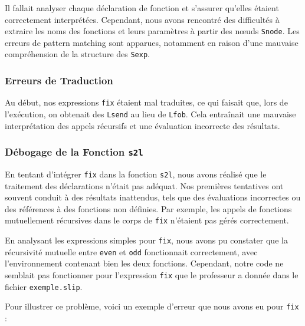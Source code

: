 \documentclass[a4paper,12pt]{article}
\begin{document}
Il fallait analyser chaque déclaration de fonction et s'assurer qu'elles étaient correctement interprétées. Cependant, nous avons rencontré des difficultés à extraire les noms des fonctions et leurs paramètres à partir des nœuds \texttt{Snode}. Les erreurs de pattern matching sont apparues, notamment en raison d'une mauvaise compréhension de la structure des \texttt{Sexp}.

\subsubsection{Erreurs de Traduction}

Au début, nos expressions \texttt{fix} étaient mal traduites, ce qui faisait que, lors de l'exécution, on obtenait des \texttt{Lsend} au lieu de \texttt{Lfob}. Cela entraînait une mauvaise interprétation des appels récursifs et une évaluation incorrecte des résultats.

\subsubsection{Débogage de la Fonction \texttt{s2l}}

En tentant d'intégrer \texttt{fix} dans la fonction \texttt{s2l}, nous avons réalisé que le traitement des déclarations n'était pas adéquat. Nos premières tentatives ont souvent conduit à des résultats inattendus, tels que des évaluations incorrectes ou des références à des fonctions non définies. Par exemple, les appels de fonctions mutuellement récursives dans le corps de \texttt{fix} n'étaient pas gérés correctement.

En analysant les expressions simples pour \texttt{fix}, nous avons pu constater que la récursivité mutuelle entre \texttt{even} et \texttt{odd} fonctionnait correctement, avec l'environnement contenant bien les deux fonctions. Cependant, notre code ne semblait pas fonctionner pour l'expression \texttt{fix} que le professeur a donnée dans le fichier \texttt{exemple.slip}.

Pour illustrer ce problème, voici un exemple d'erreur que nous avons eu pour \texttt{fix} :
\end{document}
